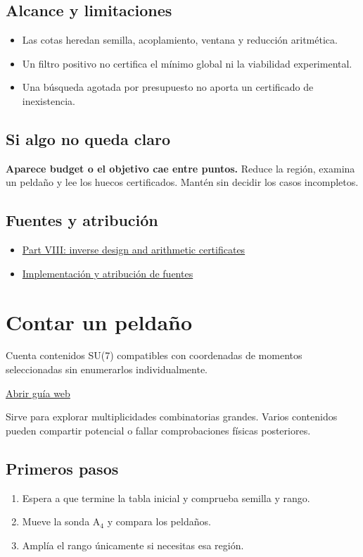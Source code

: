 \documentclass[11pt,a4paper]{article}
\begin{document}
\subsection*{Alcance y limitaciones}
\begin{itemize}
\item Las cotas heredan semilla, acoplamiento, ventana y reducción aritmética.
\item Un filtro positivo no certifica el mínimo global ni la viabilidad experimental.
\item Una búsqueda agotada por presupuesto no aporta un certificado de inexistencia.
\end{itemize}
\subsection*{Si algo no queda claro}
\textbf{Aparece budget o el objetivo cae entre puntos.} Reduce la región, examina un peldaño y lee los huecos certificados. Mantén sin decidir los casos incompletos.

\subsection*{Fuentes y atribución}
\begin{itemize}
\item \href{https://karlesmarin.github.io/ghu-explorer/papers/part-viii/index.html}{Part VIII: inverse design and arithmetic certificates}
\item \href{https://github.com/karlesmarin/ghu-lab/blob/main/src/sections/inverse_section.js}{Implementación y atribución de fuentes}
\end{itemize}
\section{Contar un peldaño}
Cuenta contenidos SU(7) compatibles con coordenadas de momentos seleccionadas sin enumerarlos individualmente.

\href{https://karlesmarin.github.io/ghu-explorer/guide/es/census/index.html}{Abrir guía web}

Sirve para explorar multiplicidades combinatorias grandes. Varios contenidos pueden compartir potencial o fallar comprobaciones físicas posteriores.
\subsection*{Primeros pasos}
\begin{enumerate}
\item Espera a que termine la tabla inicial y comprueba semilla y rango.
\item Mueve la sonda A\ensuremath{{}_{4}} y compara los peldaños.
\item Amplía el rango únicamente si necesitas esa región.
\end{enumerate}
\end{document}
